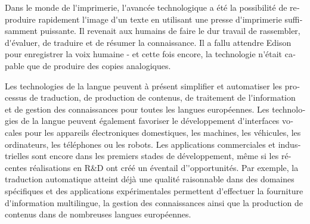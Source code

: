 \begin{french}
\begin{multicols}{2}
Dans le monde de l{\mbox '}imprimerie, l{\mbox '}avancée technologique
a été la possibilité de reproduire rapidement l{\mbox '}image d{\mbox
 '}un texte en utilisant une presse d{\mbox '}imprimerie suffisamment
puissante. Il revenait aux humains de faire le dur travail de
rassembler, d{\mbox '}évaluer, de traduire et de résumer la
connaissance. Il a fallu attendre Edison pour enregistrer la voix
humaine - et cette fois encore, la technologie n{\mbox '}était capable
que de produire des copies analogiques.

Les technologies de la langue peuvent à présent simplifier et
automatiser les processus de traduction, de production de contenus, de
traitement de l{\mbox '}information et de gestion des connaissances
pour toutes les langues européennes. Les technologies de la langue
peuvent également favoriser le développement d{\mbox '}interfaces
vocales pour les appareils électroniques domestiques, les machines,
les véhicules, les ordinateurs, les téléphones ou les robots. Les applications
commerciales et industrielles sont encore dans les premiers stades de
développement, même si les récentes réalisations en R\&D ont créé un
éventail d'{\mbox '}opportunités. Par exemple, la traduction
automatique atteint déjà une qualité raisonnable dans des domaines
spécifiques et des applications expérimentales permettent d{\mbox
 '}effectuer la fourniture d{\mbox '}information multilingue, la
gestion des connaissances ainsi que la production de contenus dans de
nombreuses langues européennes.



\end{multicols}
\end{french}
